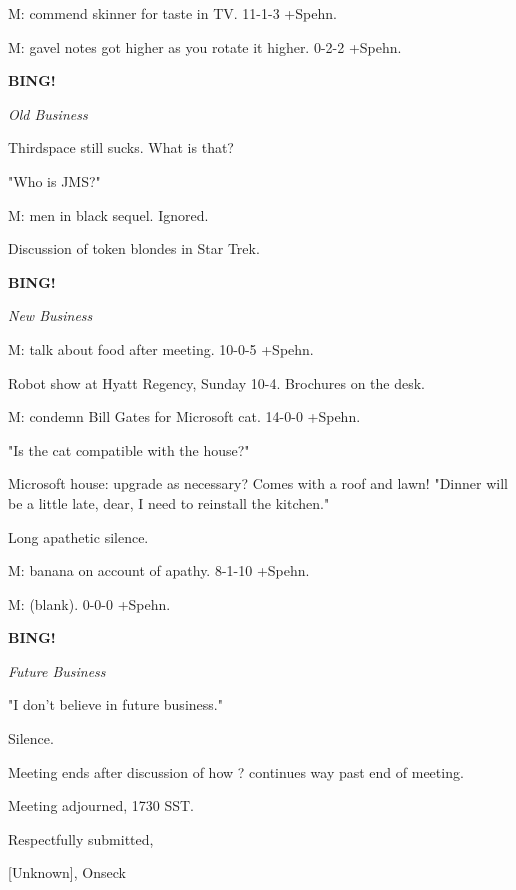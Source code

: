 \documentclass[12pt]{article}
\newcommand{\bing}{{\bf BING!} }
\newcommand{\goto}[1]{\bing \vskip 12pt \centerline{{\em{#1}}}}
\begin{document}
M: commend skinner for taste in TV. 11-1-3 +Spehn.

M: gavel notes got higher as you rotate it higher. 0-2-2 +Spehn.

\goto{Old Business}

Thirdspace still sucks. What is that?

"Who is JMS?"

M: men in black sequel. Ignored.

Discussion of token blondes in Star Trek.

\goto{New Business}

M: talk about food after meeting. 10-0-5 +Spehn.

Robot show at Hyatt Regency, Sunday 10-4. Brochures on the desk.

M: condemn Bill Gates for Microsoft cat. 14-0-0 +Spehn.

"Is the cat compatible with the house?"

Microsoft house: upgrade as necessary? Comes with a roof and lawn! "Dinner will be a little late, dear, I need to reinstall the kitchen."

Long apathetic silence.

M: banana on account of apathy. 8-1-10 +Spehn.

M: (blank). 0-0-0 +Spehn.

\goto{Future Business}

"I don't believe in future business."

Silence.

Meeting ends after discussion of how ? continues way past end of meeting.

\vspace{12pt}

\noindent
Meeting adjourned, 1730 SST.

\vspace{18pt}

\centerline{Respectfully submitted,}
\centerline{[Unknown], Onseck}
\end{document}

